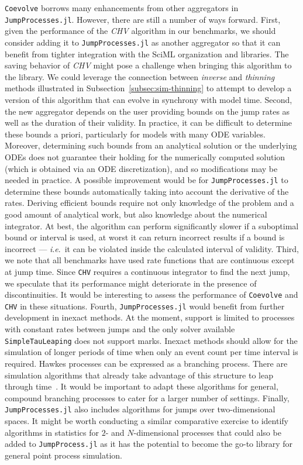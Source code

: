 \documentclass{juliacon}
\numberwithin{equation}{section}
\newcommand{\ie}{\textit{i}.\textit{e}.}
\begin{document}
\texttt{Coevolve} borrows many enhancements from other aggregators in \texttt{JumpProcesses.jl}. However, there are still a number of ways forward. First, given the performance of the \textit{CHV} algorithm in our benchmarks, we should consider adding it to \texttt{JumpProcesses.jl} as another aggregator so that it can benefit from tighter integration with the SciML organization and libraries. The saving behavior of \textit{CHV} might pose a challenge when bringing this algorithm to the library. We could leverage the connection between \textit{inverse} and \textit{thinning} methods illustrated in Subsection~\ref{subsec:sim-thinning} to attempt to develop a version of this algorithm that can evolve in synchrony with model time. Second, the new aggregator depends on the user providing bounds on the jump rates as well as the duration of their validity. In practice, it can be difficult to determine these bounds a priori, particularly for models with many ODE variables. Moreover, determining such bounds from an analytical solution or the underlying ODEs does not guarantee their holding for the numerically computed solution (which is obtained via an ODE discretization), and so modifications may be needed in practice. A possible improvement would be for \texttt{JumpProcesses.jl} to determine these bounds automatically taking into account the derivative of the rates. Deriving efficient bounds require not only knowledge of the problem and a good amount of analytical work, but also knowledge about the numerical integrator. At best, the algorithm can perform significantly slower if a suboptimal bound or interval is used, at worst it can return incorrect results if a bound is incorrect --- \ie~it can be violated inside the calculated interval of validity. Third, we note that all benchmarks have used rate functions that are continuous except at jump time. Since \texttt{CHV} requires a continuous integrator to find the next jump, we speculate that its performance might deteriorate in the presence of discontinuities. It would be interesting to assess the performance of \texttt{Coevolve} and \texttt{CHV} in these situations. Fourth, \texttt{JumpProcesses.jl} would benefit from further development in inexact methods. At the moment, support is limited to processes with constant rates between jumps and the only solver available \texttt{SimpleTauLeaping} does not support marks. Inexact methods should allow for the simulation of longer periods of time when only an event count per time interval is required. Hawkes processes can be expressed as a branching process. There are simulation algorithms that already take advantage of this structure to leap through time~\cite{laub2021}. It would be important to adapt these algorithms for general, compound branching processes to cater for a larger number of settings. Finally, \texttt{JumpProcesses.jl} also includes algorithms for jumps over two-dimensional spaces. It might be worth conducting a similar comparative exercise to identify algorithms in statistics for \(2 \)- and \( N \)-dimensional processes that could also be added to \texttt{JumpProcess.jl} as it has the potential to become the go-to library for general point process simulation.
\end{document}
